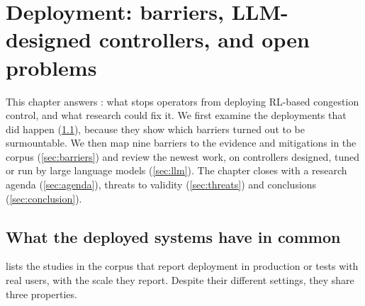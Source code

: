 \chapter{Deployment: barriers, LLM-designed controllers, and open problems}
\label{ch:deployment}

This chapter answers : what stops operators from deploying RL-based congestion control, and what research could fix it. We first examine the deployments that did happen (\cref{sec:deployed}), because they show which barriers turned out to be surmountable. We then map nine barriers to the evidence and mitigations in the corpus (\cref{sec:barriers}) and review the newest work, on controllers designed, tuned or run by large language models (\cref{sec:llm}). The chapter closes with a research agenda (\cref{sec:agenda}), threats to validity (\cref{sec:threats}) and conclusions (\cref{sec:conclusion}).

\section{What the deployed systems have in common}
\label{sec:deployed}

 lists the studies in the corpus that report deployment in production or tests with real users, with the scale they report. Despite their different settings, they share three properties.


